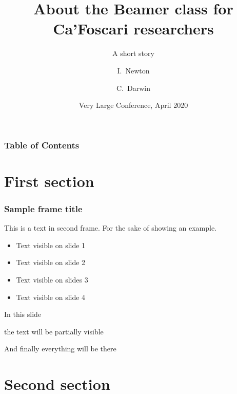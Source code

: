 \documentclass[aspectratio=169]{beamer}
\title[About Beamer] %
{About the Beamer class for Ca'Foscari researchers}\subtitle{A short story}
\author[Newton, Darwin] %
{I.~Newton\inst{1} \and C.~Darwin\inst{2}}
\institute[VFU] %
{
  \inst{1}%
  Department of Molecular Sciences and Nanosystems\\
  Ca' Foscari University, Via Torino 155, 30170 Venezia Mestre, Italy
  \and
  \inst{2}%
  European Centre for Living Technologies (ECLT)\\
 Ca' Bottacin, 3911 Dorsoduro Calle Crosera, 30123 Venice, Italy
 }
\date[VLC 2014] %
{Very Large Conference, April 2020}
\begin{document}
\frame{\titlepage}
\begin{frame}
\frametitle{Table of Contents}
\tableofcontents
\end{frame}


\section{First section}


\begin{frame}
\frametitle{Sample frame title}
This is a text in second frame. For the sake of showing an example.

\begin{itemize}
    \item<1-> Text visible on slide 1
    \item<2-> Text visible on slide 2
    \item<3> Text visible on slides 3
    \item<4-> Text visible on slide 4
\end{itemize}
\end{frame}



\begin{frame}
In this slide \pause

the text will be partially visible \pause

And finally everything will be there
\end{frame}

\section{Second section}
\end{document}
